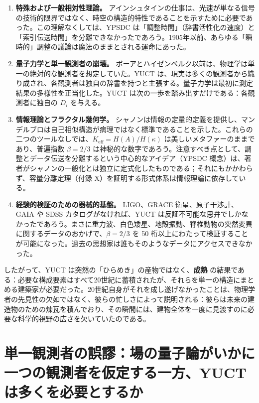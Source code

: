 \documentclass[12pt,a4paper]{article}
\begin{document}
	\begin{enumerate}[leftmargin=*, label=\textbf{\arabic*.}]
		\item \textbf{特殊および一般相対性理論。} アインシュタインの仕事は、光速が単なる信号の技術的限界ではなく、時空の構造的特性であることを示すために必要であった。この理解なくしては、YPSDC は「調整時間」（辞書活性化の速度）と「索引伝送時間」を分離できなかったであろう。1905年以前、あらゆる「瞬時的」調整の議論は魔法のままとされる運命にあった。
		
		\item \textbf{量子力学と単一観測者の崩壊。} ボーアとハイゼンベルク以前は、物理学は単一の絶対的な観測者を想定していた。YUCT は、現実は多くの観測者から織り成され、各観測者は独自の辞書を持つと主張する。量子力学は最初に測定結果の多様性を正当化した。YUCT は次の一歩を踏み出すだけである：各観測者に独自の \(D_i\) を与える。
		
		\item \textbf{情報理論とフラクタル幾何学。} シャノンは情報の定量的定義を提供し、マンデルブロは自己相似構造が病理ではなく標準であることを示した。これらの二つのツールなしでは、\(K_{\mathrm{eff}} = H(A)/H(\kappa)\) は美しいメタファーのままであり、普遍指数 \(\beta=2/3\) は神秘的な数字であろう。注意すべき点として、調整とデータ伝送を分離するという中心的なアイデア（YPSDC 概念）は、著者がシャノンの一般化とは独立に定式化したものである；それにもかかわらず、容量分離定理（付録 X）を証明する形式体系は情報理論に依存している。
		
		\item \textbf{経験的検証のための器械的基盤。} LIGO、GRACE 衛星、原子干渉計、GAIA や SDSS カタログがなければ、YUCT は反証不可能な思弁でしかなかったであろう。まさに重力波、白色矮星、地殻振動、脊椎動物の突然変異に関するデータのおかげで、\(\beta=2/3\) を 50 桁以上にわたって検証することが可能になった。過去の思想家は誰もそのようなデータにアクセスできなかった。
	\end{enumerate}
	
	したがって、YUCT は突然の「ひらめき」の産物ではなく、\textbf{成熟} の結果である：必要な構成要素はすべて20世紀に蓄積されたが、それらを単一の構造にまとめる建築家が必要だった。20世紀自身がそれを成し遂げなかったことは、物理学者の先見性の欠如ではなく、彼らの忙しさによって説明される：彼らは未来の建造物のための煉瓦を積んでおり、その瞬間には、建物全体を一度に見渡すのに必要な科学的視野の広さを欠いていたのである。
	
	\section{単一観測者の誤謬：場の量子論がいかに一つの観測者を仮定する一方、YUCT は多くを必要とするか}
	
\end{document}
